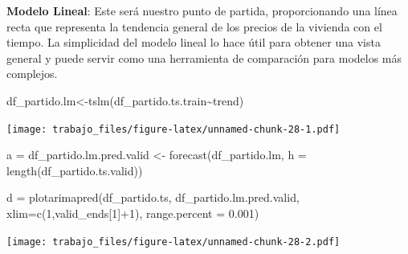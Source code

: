 \documentclass[
]{article}
\newenvironment{Shaded}{\begin{snugshade}}{\end{snugshade}}
\newcommand{\AttributeTok}[1]{\textcolor[rgb]{0.77,0.63,0.00}{#1}}
\newcommand{\DecValTok}[1]{\textcolor[rgb]{0.00,0.00,0.81}{#1}}
\newcommand{\FloatTok}[1]{\textcolor[rgb]{0.00,0.00,0.81}{#1}}
\newcommand{\FunctionTok}[1]{\textcolor[rgb]{0.00,0.00,0.00}{#1}}
\newcommand{\NormalTok}[1]{#1}
\newcommand{\OtherTok}[1]{\textcolor[rgb]{0.56,0.35,0.01}{#1}}
\newcommand{\SpecialCharTok}[1]{\textcolor[rgb]{0.00,0.00,0.00}{#1}}
\newcommand{\StringTok}[1]{\textcolor[rgb]{0.31,0.60,0.02}{#1}}
\begin{document}
\textbf{Modelo Lineal}: Este será nuestro punto de partida,
proporcionando una línea recta que representa la tendencia general de
los precios de la vivienda con el tiempo. La simplicidad del modelo
lineal lo hace útil para obtener una vista general y puede servir como
una herramienta de comparación para modelos más complejos.

\begin{Shaded}
\begin{Highlighting}[]
\NormalTok{df\_partido.lm}\OtherTok{\textless{}{-}}\FunctionTok{tslm}\NormalTok{(df\_partido.ts.train}\SpecialCharTok{\textasciitilde{}}\NormalTok{trend)}
\end{Highlighting}
\end{Shaded}

\begin{Shaded}
\end{Shaded}

\texttt{[image: trabajo\_files/figure-latex/unnamed-chunk-28-1.pdf]}

\begin{Shaded}
\begin{Highlighting}[]
\NormalTok{a }\OtherTok{=}\NormalTok{ df\_partido.lm.pred.valid }\OtherTok{\textless{}{-}} \FunctionTok{forecast}\NormalTok{(df\_partido.lm, }\AttributeTok{h =} \FunctionTok{length}\NormalTok{(df\_partido.ts.valid))}

\NormalTok{d }\OtherTok{=} \FunctionTok{plotarimapred}\NormalTok{(df\_partido.ts, df\_partido.lm.pred.valid, }\AttributeTok{xlim=}\FunctionTok{c}\NormalTok{(}\DecValTok{1}\NormalTok{,valid\_ends[}\DecValTok{1}\NormalTok{]}\SpecialCharTok{+}\DecValTok{1}\NormalTok{), }\AttributeTok{range.percent =} \FloatTok{0.001}\NormalTok{)}
\end{Highlighting}
\end{Shaded}

\texttt{[image: trabajo\_files/figure-latex/unnamed-chunk-28-2.pdf]}
\end{document}
